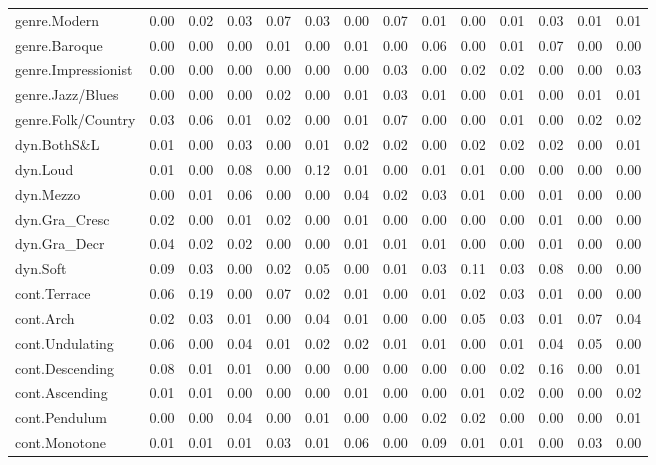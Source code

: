 \documentclass[
]{article}
\newenvironment{lltable}{\begin{landscape}\begin{center}\begin{ThreePartTable}}{\end{ThreePartTable}\end{center}\end{landscape}}
\begin{document}
\begin{lltable}
{\begin{longtable}{llllllllllllll}
genre.Modern & 0.00 & 0.02 & 0.03 & 0.07 & 0.03 & 0.00 & 0.07 & 0.01 & 0.00 & 0.01 & 0.03 & 0.01 & 0.01\\
genre.Baroque & 0.00 & 0.00 & 0.00 & 0.01 & 0.00 & 0.01 & 0.00 & 0.06 & 0.00 & 0.01 & 0.07 & 0.00 & 0.00\\
genre.Impressionist & 0.00 & 0.00 & 0.00 & 0.00 & 0.00 & 0.00 & 0.03 & 0.00 & 0.02 & 0.02 & 0.00 & 0.00 & 0.03\\
genre.Jazz/Blues & 0.00 & 0.00 & 0.00 & 0.02 & 0.00 & 0.01 & 0.03 & 0.01 & 0.00 & 0.01 & 0.00 & 0.01 & 0.01\\
genre.Folk/Country & 0.03 & 0.06 & 0.01 & 0.02 & 0.00 & 0.01 & 0.07 & 0.00 & 0.00 & 0.01 & 0.00 & 0.02 & 0.02\\
dyn.BothS\&L & 0.01 & 0.00 & 0.03 & 0.00 & 0.01 & 0.02 & 0.02 & 0.00 & 0.02 & 0.02 & 0.02 & 0.00 & 0.01\\
dyn.Loud & 0.01 & 0.00 & 0.08 & 0.00 & 0.12 & 0.01 & 0.00 & 0.01 & 0.01 & 0.00 & 0.00 & 0.00 & 0.00\\
dyn.Mezzo & 0.00 & 0.01 & 0.06 & 0.00 & 0.00 & 0.04 & 0.02 & 0.03 & 0.01 & 0.00 & 0.01 & 0.00 & 0.00\\
dyn.Gra\_Cresc & 0.02 & 0.00 & 0.01 & 0.02 & 0.00 & 0.01 & 0.00 & 0.00 & 0.00 & 0.00 & 0.01 & 0.00 & 0.00\\
dyn.Gra\_Decr & 0.04 & 0.02 & 0.02 & 0.00 & 0.00 & 0.01 & 0.01 & 0.01 & 0.00 & 0.00 & 0.01 & 0.00 & 0.00\\
dyn.Soft & 0.09 & 0.03 & 0.00 & 0.02 & 0.05 & 0.00 & 0.01 & 0.03 & 0.11 & 0.03 & 0.08 & 0.00 & 0.00\\
cont.Terrace & 0.06 & 0.19 & 0.00 & 0.07 & 0.02 & 0.01 & 0.00 & 0.01 & 0.02 & 0.03 & 0.01 & 0.00 & 0.00\\
cont.Arch & 0.02 & 0.03 & 0.01 & 0.00 & 0.04 & 0.01 & 0.00 & 0.00 & 0.05 & 0.03 & 0.01 & 0.07 & 0.04\\
cont.Undulating & 0.06 & 0.00 & 0.04 & 0.01 & 0.02 & 0.02 & 0.01 & 0.01 & 0.00 & 0.01 & 0.04 & 0.05 & 0.00\\
cont.Descending & 0.08 & 0.01 & 0.01 & 0.00 & 0.00 & 0.00 & 0.00 & 0.00 & 0.00 & 0.02 & 0.16 & 0.00 & 0.01\\
cont.Ascending & 0.01 & 0.01 & 0.00 & 0.00 & 0.00 & 0.01 & 0.00 & 0.00 & 0.01 & 0.02 & 0.00 & 0.00 & 0.02\\
cont.Pendulum & 0.00 & 0.00 & 0.04 & 0.00 & 0.01 & 0.00 & 0.00 & 0.02 & 0.02 & 0.00 & 0.00 & 0.00 & 0.01\\
cont.Monotone & 0.01 & 0.01 & 0.01 & 0.03 & 0.01 & 0.06 & 0.00 & 0.09 & 0.01 & 0.01 & 0.00 & 0.03 & 0.00\\

\end{longtable}}
\end{lltable}
\end{document}
